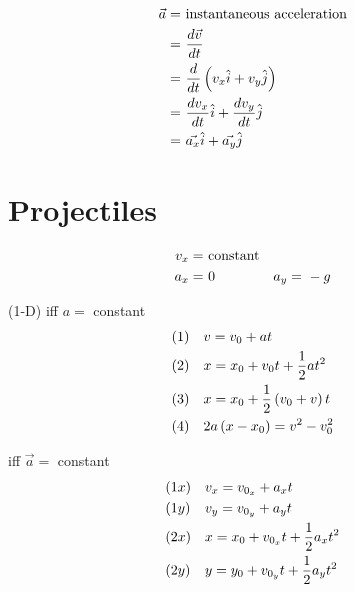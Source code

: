 	\begin{align}
		\vec{a} = \ &\text{instantaneous acceleration}& \notag \\
		= \ &\frac{d \vec{v}}{dt}& \notag \\
		= \ &\frac{d}{dt} \left( v_{x} \hat{i} + v_{y} \hat{j} \right)& \notag \\
		= \ &\frac{dv_{x}}{dt}\hat{i} + \frac{dv_{y}}{dt}\hat{j}& \notag \\
		= \ &\vec{a_{x}}\hat{i} + \vec{a_{y}}\hat{j}& \notag
	\end{align}

\section{Projectiles}
	\begin{align}
		v_{x} = \ &\text{constant}& \notag \\
		a_{x} = \ &0& \notag
		a_{y} = \ &-g& \notag
	\end{align}

	(1-D) iff $a =$ constant
	\begin{align}
		&(1)& &v = v_{0} + at& \notag \\
		&(2)& &x = x_{0} + v_{0}t + \frac{1}{2}at^{2}& \notag \\
		&(3)& &x = x_{0} + \frac{1}{2}\left( v_{0} + v \right)t& \notag \\
		&(4)& &2a\left( x - x_{0} \right) = v^{2} - v_{0}^{2}& \notag
	\end{align}

	iff $\vec{a} =$ constant
	\begin{align}
		&(1x)& &v_{x} = v_{0_{x}} + a_{x}t& \notag \\
		&(1y)& &v_{y} = v_{0_{y}} + a_{y}t& \notag \\
		&(2x)& &x = x_{0} + v_{0_{x}}t + \frac{1}{2}a_{x}t^{2}& \notag \\
		&(2y)& &y = y_{0} + v_{0_{y}}t + \frac{1}{2}a_{y}t^{2}& \notag
	\end{align}

